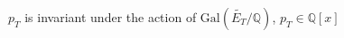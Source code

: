 \documentclass[preview]{standalone}
\begin{document}
\begin{center}
$p_T$ is invariant under the action of $\text{Gal}\left(\widetilde{E_T}/\mathbb{Q}\right)$, $p_T \in \mathbb{Q}[x]$
\end{center}
\end{document}
